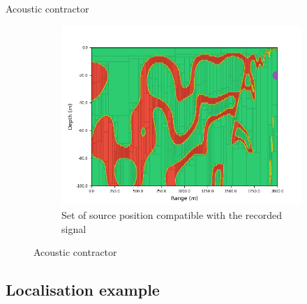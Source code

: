 \documentclass[9pt, xcolor={usenames, dvipsnames}]{beamer}
\begin{document}
\begin{frame}{Acoustic contractor}
\begin{minipage}[t]{0.35\textwidth}
\begin{figure}[!htb]
\begin{subfigure}[!htb]{\textwidth}
								\includegraphics[width=\textwidth]{images/localisation/Hydrophone_20_2000.png}
								\caption{Set of source position compatible with the recorded signal}
							\end{subfigure}
							\caption{Acoustic contractor}
						\end{figure}
					\end{minipage}
				\end{frame}
		
			\subsection{Localisation example}
		
\end{document}
